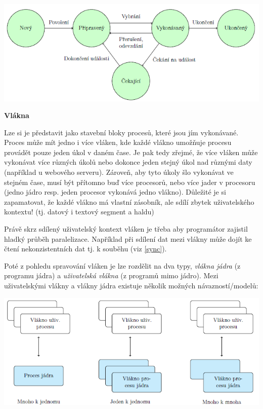 \begin{center}
    \includegraphics[scale=1]{images/proc_states.png}
\end{center}

\begin{Large}
    \vspace{0,5cm}
    \textbf{Vlákna}
\end{Large}

Lze si je představit jako stavební bloky procesů, které jsou jím vykonávané. Proces může mít jedno i více vláken, kde každé vlákno umožňuje procesu provádět pouze jeden úkol v daném čase. Je pak tedy zřejmé, že více vláken může vykonávat více různých úkolů nebo dokonce jeden stejný úkol nad různými daty (například u webového serveru). Zároveň, aby tyto úkoly šlo vykonávat ve stejném čase, musí být přítomno buď více procesorů, nebo více jader v procesoru (jedno jádro resp. jeden procesor vykonává jedno vlákno). Důležité je si zapamatovat, že každé vlákno má vlastní zásobník, ale sdílí zbytek uživatelského kontextu! (tj. datový i textový segment a haldu)

\vspace{0,5cm}

Právě skrz sdílený uživatelský kontext vláken je třeba aby programátor zajistil hladký průběh paralelizace. Například při sdílení dat mezi vlákny může dojít ke čtení nekonzistentních dat tj. k souběhu (viz \ref{sync}). 

\vspace{0,5cm}

Poté z pohledu spravování vláken je lze rozdělit na dva typy, \textit{vlákna jádra} (z programu jádra) a \textit{uživatelská vlákna} (z programů mimo jádro). Mezi uživatelskými vlákny a vlákny jádra existuje několik možných návazností/modelů:

\begin{center}
    \includegraphics[scale=1]{images/thread_models.png}
\end{center}


